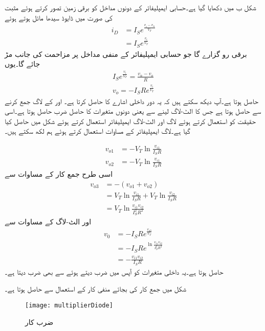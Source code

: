 شکل  ب میں   دکھایا گیا ہے۔حسابی ایمپلیفائر کے دونوں مداخل کو برقی زمین تصور کرتے ہوئے مثبت  کی صورت میں ڈایوڈ  سیدھا مائل ہوتے ہوئے
\begin{align*}
i_D&=I_S e^{\frac{v_i-v_n}{V_T}}\\
&=I_S e^{\frac{v_i}{V_T}}
\end{align*}
برقی رو گزارے گا جو حسابی ایمپلیفائر کے منفی مداخل پر مزاحمت کی جانب مڑ جائے گا۔یوں
\begin{align*}
I_S e^{\frac{v_i}{V_T}}=\frac{v_n-v_o}{R}\\
v_o=-I_S R e^{\frac{v_i}{V_T}}
\end{align*}
حاصل ہوتا ہے۔آپ دیکھ سکتے ہیں کہ یہ دور داخلی اشارے کا  حاصل کرتا ہے۔
 اور  کے لاگ جمع کرنے سے  حاصل ہوتا ہے جس کا الٹ-لاگ لینے سے  یعنی دونوں متغیرات کا حاصل ضرب حاصل ہوتا ہے۔اسی حقیقت کو استعمال کرتے ہوئے لاگ اور الٹ-لاگ ایمپلیفائر استعمال کرتے  ہوئے شکل  میں  حاصل کیا گیا ہے۔لاگ ایمپلیفائر کے مساوات استعمال کرتے ہوئے ہم لکھ سکتے ہیں۔

\begin{align*}
v_{o1}&=-V_T \ln \frac{v_{i1}}{I_S R}\\
v_{o2}&=-V_T \ln \frac{v_{i1}}{I_S R}
\end{align*}
اسی طرح جمع کار کے مساوات سے 
\begin{align*}
v_{o3}&=-\left(v_{o1}+v_{o2} \right)\\
&=V_T \ln \frac{v_{i1}}{I_S R}+V_T \ln \frac{v_{i2}}{I_S R}\\
&=V_T \ln \frac{v_{i1} v_{i2}}{I_S^2 R^2}
\end{align*}
اور الٹ-لاگ کے مساوات سے
\begin{align*}
v_0&=-I_S R e^{\frac{v_{o3}}{V_T}}\\
&=-I_S R e^{\ln \frac{v_{i1} v_{i2}}{I_S^2 R^2}}\\
&=-\frac{v_{i1} v_{i2}}{I_S R}
\end{align*}
حاصل ہوتا ہے۔یہ  داخلی متغیرات کو آپس میں ضرب دیتے ہوئے  سے بھی ضرب دیتا ہے۔

شکل میں جمع کار کی بجائے منفی کار کے استعمال سے  حاصل ہوتا ہے۔
%
\begin{figure}
\centering
\texttt{[image: multiplierDiode]}
\caption{ضرب کار}
\label{شکل_ڈایوڈ_ضرب_کار}
\end{figure}



